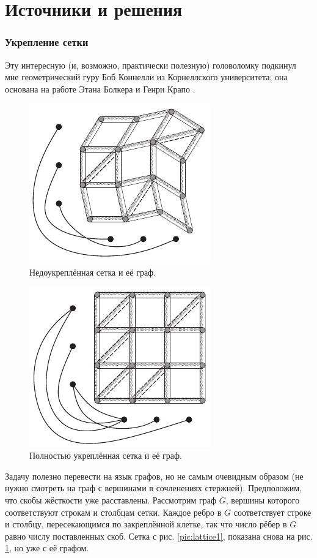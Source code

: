 \section*{Источники и решения}

\subsubsection*{Укрепление сетки}

Эту интересную (и, возможно, практически полезную) головоломку подкинул мне геометрический гуру Боб Коннелли из Корнеллского университета; она основана на работе Этана Болкера и Генри Крапо \cite{8}.


\begin{figure}[ht!]
\centering
\includegraphics[scale=1]{pics/lattice2}
\caption{Недоукреплённая сетка и её граф.}
\label{pic:lattice2}
\end{figure}

\begin{figure}[t!]
\centering
\includegraphics[scale=1]{pics/lattice3}
\caption{Полностью укреплённая сетка и её граф.}
\label{pic:lattice3}
\end{figure}

Задачу полезно перевести на язык графов, но не самым очевидным образом (не нужно смотреть на граф с вершинами в сочленениях стержней).
Предположим, что скобы жёсткости уже расставлены.
Рассмотрим граф $G$, вершины которого соответствуют строкам и столбцам сетки.
Каждое ребро в $G$ соответствует строке и столбцу, пересекающимся по закреплённой клетке, так что число рёбер в $G$ равно числу поставленных скоб.
Сетка с рис. \ref{pic:lattice1}, показана снова на рис. \ref{pic:lattice2}, но уже с её графом.

